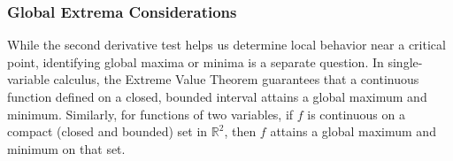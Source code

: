 \begin{example}
\begin{solution}
            \begin{center}
            \end{center}
            


    \end{solution}
\end{example}
\exampleline


\subsubsection*{Global Extrema Considerations}  

\noindent While the second derivative test helps us determine local behavior near a critical point, identifying global maxima or minima is a separate question. In single-variable calculus, the Extreme Value Theorem guarantees that a continuous function defined on a closed, bounded interval attains a global maximum and minimum. Similarly, for functions of two variables, if \( f \) is continuous on a compact (closed and bounded) set in \(\mathbb{R}^2\), then \( f \) attains a global maximum and minimum on that set. \\

